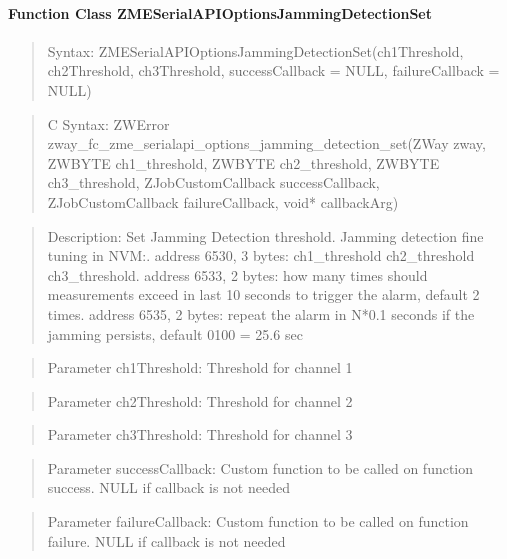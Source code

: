 \paragraph{Function Class ZMESerialAPIOptionsJammingDetectionSet}
\begin{quote}Syntax: ZMESerialAPIOptionsJammingDetectionSet(ch1Threshold, ch2Threshold, ch3Threshold, successCallback = NULL, failureCallback = NULL)\end{quote}
\begin{quote}C Syntax: ZWError zway\_fc\_zme\_serialapi\_options\_jamming\_detection\_set(ZWay zway, ZWBYTE ch1\_threshold, ZWBYTE ch2\_threshold, ZWBYTE ch3\_threshold, ZJobCustomCallback successCallback, ZJobCustomCallback failureCallback, void* callbackArg)\end{quote}
\begin{quote}Description: Set Jamming Detection threshold. Jamming detection fine tuning in NVM:. address 6530, 3 bytes: ch1\_threshold ch2\_threshold ch3\_threshold. address 6533, 2 bytes: how many times should measurements exceed in last 10 seconds to trigger the alarm, default 2 times. address 6535, 2 bytes: repeat the alarm in N*0.1 seconds if the jamming persists, default 0100 = 25.6 sec\end{quote}
\begin{quote}Parameter ch1Threshold: Threshold for channel 1\end{quote}
\begin{quote}Parameter ch2Threshold: Threshold for channel 2\end{quote}
\begin{quote}Parameter ch3Threshold: Threshold for channel 3\end{quote}
\begin{quote}Parameter successCallback: Custom function to be called on function success. NULL if callback is not needed\end{quote}
\begin{quote}Parameter failureCallback: Custom function to be called on function failure. NULL if callback is not needed\end{quote}


